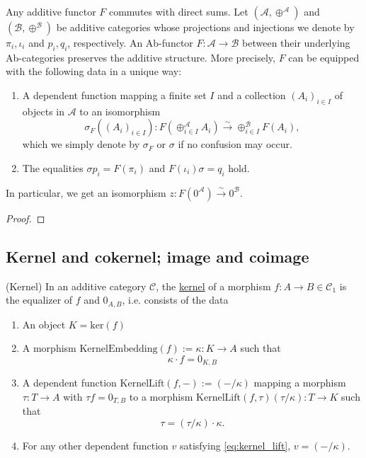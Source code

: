 \begin{lemma}
Any additive functor $F$ commutes with direct sums.
Let $( \mathcal{A},\oplus^{\mathcal{A}} )$ and $( \mathcal{B}, \oplus^{\mathcal{B}} )$ be additive categories whose projections and injections
we denote by $\pi_{i}, \iota_{i}$ and $p_{i}, q_{i}$, respectively. An Ab-functor $F : \mathcal{A} \rightarrow \mathcal{B}$ between their underlying
Ab-categories preserves the additive structure. More precisely, $F$ can be equipped with the following data in a unique way:
\begin{enumerate}
\item A dependent function mapping a finite set $I$ and a collection $(A_{i})_{i\in I}$ of objects in $\mathcal{A}$ to an isomorphism
\[
\sigma_{F}( (A_{i})_{i\in I}) : F( \oplus_{i\in I}^{\mathcal{A}} A_{i} ) \xrightarrow{\sim} \oplus_{i\in I}^{\mathcal{B}} F( A_{i} ),
\]
which we simply denote by $\sigma_{F}$ or $\sigma$ if no confusion may occur.
\item The equalities $\sigma p_{i} = F(\pi_{i})$ and $F(\iota_{i}) \sigma = q_{i}$ hold.
\end{enumerate}
In particular, we get an isomorphism $z : F( 0^{\mathcal{A}} ) \xrightarrow{\sim} 0^{\mathcal{B}}$.
\end{lemma}
\begin{proof}

\end{proof}

\subsection{Kernel and cokernel; image and coimage}

\begin{definition}{(Kernel)}
In an additive category $\mathcal{C}$, the \ul{kernel} of a morphism $f : A \rightarrow B \in \mathcal{C}_{1}$ is the equalizer of $f$ and $0_{A,B}$,
i.e. consists of the data
\begin{enumerate}
\renewcommand{\labelenumi}{(\theenumi)}
\item An object $K = \mathrm{ker}(f)$
\item A morphism $\mathrm{KernelEmbedding}(f) := \kappa : K \rightarrow A$ such that
\[
\kappa \cdot f = 0_{K,B}
\]
\item A dependent function $\mathrm{KernelLift}(f,-) := ( - /\kappa)$ mapping a morphism $\tau : T \rightarrow A$ with $\tau f = 0_{T,B}$ to a
morphism $\mathrm{KernelLift}(f,\tau) (\tau / \kappa) : T \rightarrow K$ such that
\[
\tau =\label{eq:kernel_lift} (\tau / \kappa) \cdot \kappa.
\]
\item For any other dependent function $v$ satisfying \eqref{eq:kernel_lift}, $v = ( - / \kappa)$.
\end{enumerate}
\end{definition}

